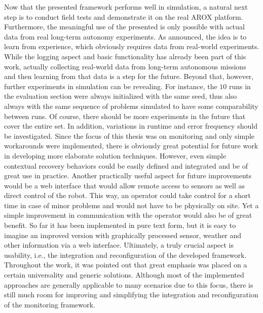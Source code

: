 \documentclass[english, master, utf8]{base/thesis_KBS}
\newcommand{\code}{\collectverb{\codebox}}
\begin{document}
Now that the presented framework performs well in simulation, a natural next step is to conduct field tests and demonstrate it on the real AROX platform. Furthermore, the meaningful
use of the presented \code{data_accumulator} is only possible with actual data from real long-term autonomy experiments. As announced, the idea is to learn from experience, which
obviously requires data from real-world experiments. While the logging aspect and basic functionality has already been part of this work, actually collecting real-world data from
long-term autonomous missions and then learning from that data is a step for the future. Beyond that, however, further experiments in simulation can be revealing. For instance, the
$10$ runs in the evaluation section were always initialized with the same seed, thus also always with the same sequence of problems simulated to have some comparability between runs.
Of course, there should be more experiments in the future that cover the entire set. In addition, variations in runtime and error frequency should be investigated. Since the focus of
this thesis was on monitoring and only simple workarounds were implemented, there is obviously great potential for future work in developing more elaborate solution techniques.
However, even simple contextual recovery behaviors could be easily defined and integrated and be of great use in practice.
Another practically useful aspect for future improvements would be a web interface that would allow remote access to sensors as well as direct control of the robot. This way, an
operator could take control for a short time in case of minor problems and would not have to be physically on site. Yet a simple improvement in communication with the operator would
also be of great benefit. So far it has been implemented in pure text form, but it is easy to imagine an improved version with graphically processed sensor, weather and other
information via a web interface. Ultimately, a truly crucial aspect is usability, i.e., the integration and reconfiguration of the developed framework. Throughout the work, it was
pointed out that great emphasis was placed on a certain universality and generic solutions. Although most of the implemented approaches are generally applicable to many scenarios due
to this focus, there is still much room for improving and simplifying the integration and reconfiguration of the monitoring framework.


\end{document}
